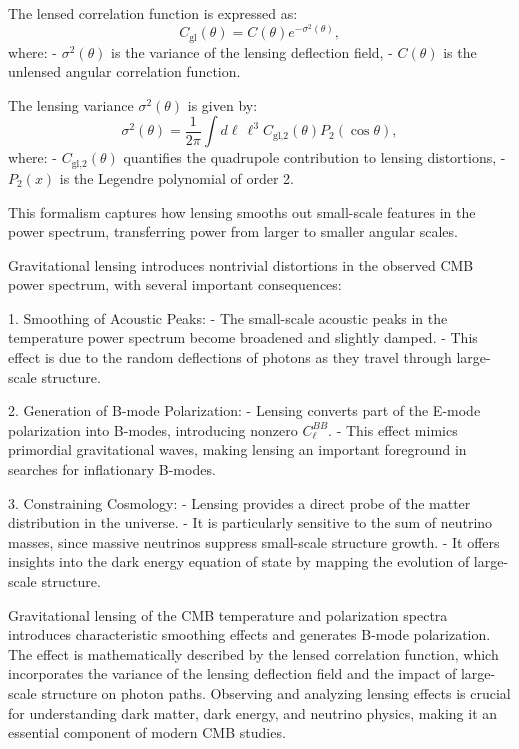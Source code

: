 \documentclass{aa}
\begin{document}
The lensed correlation function is expressed as:
\begin{equation}
C_{\text{gl}}(\theta) = C(\theta) e^{-\sigma^2(\theta)},
\end{equation}
where:
- $\sigma^2(\theta)$ is the variance of the lensing deflection field,  
- $C(\theta)$ is the unlensed angular correlation function.

The lensing variance $\sigma^2(\theta)$ is given by:
\begin{equation}
\sigma^2(\theta) = \frac{1}{2\pi} \int d\ell \, \ell^3 C_{\text{gl,2}}(\theta) P_2(\cos\theta),
\end{equation}
where:
- $C_{\text{gl,2}}(\theta)$ quantifies the quadrupole contribution to lensing distortions,  
- $P_2(x)$ is the Legendre polynomial of order 2.

This formalism captures how lensing smooths out small-scale features in the power spectrum, transferring power from larger to smaller angular scales.

Gravitational lensing introduces nontrivial distortions in the observed CMB power spectrum, with several important consequences:

1. Smoothing of Acoustic Peaks:  
   - The small-scale acoustic peaks in the temperature power spectrum become broadened and slightly damped.  
   - This effect is due to the random deflections of photons as they travel through large-scale structure.  

2. Generation of B-mode Polarization:  
   - Lensing converts part of the E-mode polarization into B-modes, introducing nonzero $C_\ell^{BB}$.  
   - This effect mimics primordial gravitational waves, making lensing an important foreground in searches for inflationary B-modes.  

3. Constraining Cosmology:  
   - Lensing provides a direct probe of the matter distribution in the universe.  
   - It is particularly sensitive to the sum of neutrino masses, since massive neutrinos suppress small-scale structure growth.  
   - It offers insights into the dark energy equation of state by mapping the evolution of large-scale structure.  

Gravitational lensing of the CMB temperature and polarization spectra introduces characteristic smoothing effects and generates B-mode polarization. The effect is mathematically described by the lensed correlation function, which incorporates the variance of the lensing deflection field and the impact of large-scale structure on photon paths. Observing and analyzing lensing effects is crucial for understanding dark matter, dark energy, and neutrino physics, making it an essential component of modern CMB studies.  
\color{black}
\end{document}
